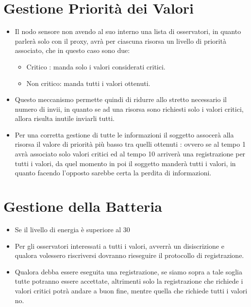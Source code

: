   \section{Gestione Priorità dei Valori}

    \begin{itemize}
      \item Il nodo sensore non avendo al suo interno una lista di osservatori, in quanto parlerà solo con il proxy, avrà per ciascuna risorsa un livello di priorità associato, che in questo caso sono due:

        \begin{itemize}
          \item Critico : manda solo i valori considerati critici.
          \item Non critico: manda tutti i valori ottenuti.
        \end{itemize}

      \item Questo meccanismo permette quindi di ridurre allo stretto necessario il numero di invii, in quanto se ad una risorsa sono richiesti solo i valori critici, allora risulta inutile inviarli tutti.
      \item Per una corretta gestione di tutte le informazioni il soggetto assocerà alla risorsa il valore di priorità più basso tra quelli ottenuti : ovvero se al tempo 1 avrà associato solo valori critici ed al tempo 10 arriverà una registrazione per tutti i valori, da quel momento in poi il soggetto manderà tutti i valori, in quanto facendo l’opposto sarebbe certa la perdita di informazioni.
    \end{itemize}

  \section{Gestione della Batteria}

    \begin{itemize}
      \item Se il livello di energia è superiore al 30%
      \item Per gli osservatori interessati a tutti i valori, avverrà un disiscrizione e qualora volessero riscriversi dovranno rieseguire il protocollo di registrazione.
      \item Qualora debba essere eseguita una registrazione, se siamo sopra a tale soglia tutte potranno essere accettate, altrimenti solo la registrazione che richiede i valori critici potrà andare a buon fine, mentre quella che richiede tutti i valori no.
    \end{itemize}

